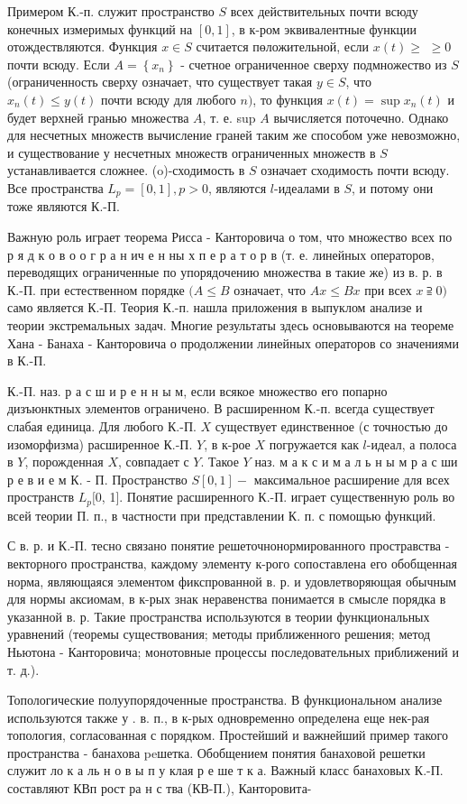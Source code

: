 \documentclass[10pt]{article}
\begin{document}
Примером К.-п. служит пространство $S$ всех действительных почти всюду конечных измеримых функций на $[0,1]$, в к-ром эквивалентные функции отождествляются. Функция $x \in S$ считается пөложительной, если $x(t) \geqslant$ $\geqslant 0$ почти всюду. Если $A=\left\{x_{n}\right\}$ - счетное ограниченное сверху подмножество из $S$ (ограниченность сверху означает, что существует такая $y \in S$, что $x_{n}(t) \leqslant y(t)$ почти всюду для любого $n)$, то функция $x(t)=\sup x_{n}(t)$ и будет верхней гранью множества $A$, т. е. sup $A$ вычисляется поточечно. Однако для несчетных множеств вычисление граней таким же способом уже невозможно, и существование у несчетных множеств ограниченных множеств в $S$ устанавливается сложнее. (o)-сходимость в $S$ означает сходимость почти всюду. Все пространства $L_{p}=[0,1], p>0$, являются $l$-идеалами в $S$, и потому они тоже являются К.-П.



Важную роль играет теорема Рисса - Канторовича о том, что множество всех по р я д к о в о о г р а н ич е н ны х п е р а т о р в (т. е. линейных операторов, переводящих ограниченные по упорядочению множества в такие же) из в. р. в К.-П. при естественном порядке $(A \leqslant B$ означает, что $A x \leqslant B x$ при всех $x \supseteqq 0)$ само является К.-П. Теория К.-п. нашла приложения в выпуклом анализе и теории экстремальных задач. Многие результаты здесь основываются на теореме Хана - Банаха - Канторовича о продолжении линейных операторов со значениями в К.-П.



К.-П. наз. р а с ш и р е н н ы м, если всякое множество его попарно дизъюнктных элементов ограничено. В расширенном К.-п. всегда существует слабая единица. Для любого К.-П. $X$ существует единственное (с точностью до изоморфизма) расширенное К.-П. $Y$, в к-рое $X$ погружается как $l$-идеал, а полоса в $Y$, порожденная $X$, совпадает с $Y$. Такое $Y$ наз. м а к с и м а л ь н ы м р а с ши р е в и е м К. - П. Пространство $S[0,1]-$ максимальное расширение для всех пространств $L_{p}[0$, 1]. Понятие расширенного К.-П. играет существенную роль во всей теории П. п., в частности при представлении К. п. с помощью функций.



С в. р. и К.-П. тесно связано понятие решеточнонормированного простравства - векторного пространства, каждому элементу к-рого сопоставлена его обобщенная норма, являющаяся элементом фикспрованной в. р. и удовлетворяющая обычным для нормы аксиомам, в к-рых знак неравенства понимается в смысле порядка в указанной в. р. Такие пространства используются в теории функциональных уравнений (теоремы существования; методы приближенного решения; метод Ньютона - Канторовича; монотовные процессы последовательных приближений и т. д.).



Топологические полуупорядоченные пространства. В функциональном анализе используются также у . в. п., в к-рых одновременно определена еще нек-рая топология, согласованная с порядком. Простейший и важнейший пример такого пространства - банахова peшетка. Обобщением понятия банаховой решетки служит ло к а ль н о в ы п у клая р е ше т к а. Важный класс банаховых К.-П. составляют КВп рост ра н с тва (КВ-П.), Канторовита-
\end{document}
